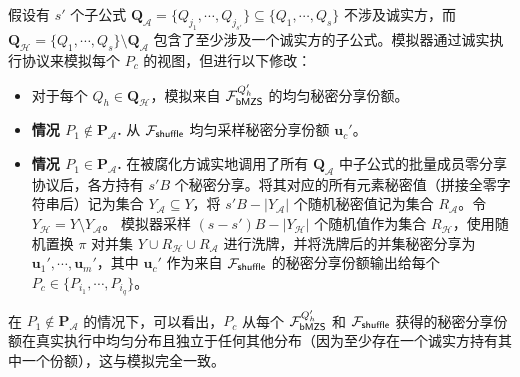 \begin{trivlist}
假设有 $s'$ 个子公式 $\textbf{Q}_{\mathcal{A}} = \{Q_{j_1},\cdots,Q_{j_{s'}}\} \subseteq \{Q_1,\cdots,Q_s\}$ 不涉及诚实方，而 $\textbf{Q}_{\mathcal{H}} = \{Q_1,\cdots,Q_s\} \setminus \textbf{Q}_{\mathcal{A}}$ 包含了至少涉及一个诚实方的子公式。模拟器通过诚实执行协议来模拟每个 $P_c$ 的视图，但进行以下修改：
\begin{itemize}[itemsep=2pt,topsep=0pt,parsep=0pt]
\item 对于每个 $Q_h \in \textbf{Q}_{\mathcal{H}}$，模拟来自 $\mathcal{F}_\mathsf{bMZS}^{Q'_h}$ 的均匀秘密分享份额。
\item \textbf{情况 $P_1 \notin \textbf{P}_{\mathcal{A}}$.} 从 $\mathcal{F}_\mathsf{shuffle}$ 均匀采样秘密分享份额 $\textbf{u}_{c}'$。
\item \textbf{情况 $P_1 \in \textbf{P}_{\mathcal{A}}$.} 在被腐化方诚实地调用了所有 $\textbf{Q}_{\mathcal{A}}$ 中子公式的批量成员零分享协议后，各方持有 $s'B$ 个秘密分享。将其对应的所有元素秘密值（拼接全零字符串后）记为集合 $Y_{\mathcal{A}} \subseteq Y$，将 $s'B - \lvert Y_{\mathcal{A}} \rvert$ 个随机秘密值记为集合 $R_{\mathcal{A}}$。令 $Y_{\mathcal{H}} = Y \setminus Y_{\mathcal{A}}$。
模拟器采样 $(s-s') B - \lvert Y_{\mathcal{H}} \rvert$ 个随机值作为集合 $R_{\mathcal{H}}$，使用随机置换 $\pi$ 对并集 $Y \cup R_{\mathcal{H}} \cup R_{\mathcal{A}}$ 进行洗牌，并将洗牌后的并集秘密分享为 $\textbf{u}_{1}', \cdots,\textbf{u}_{m}'$，其中 $\textbf{u}_{c}'$ 作为来自 $\mathcal{F}_\mathsf{shuffle}$ 的秘密分享份额输出给每个 $P_c \in \{P_{i_1},\cdots,P_{i_q}\}$。
\end{itemize}

在 $P_1 \notin \textbf{P}_{\mathcal{A}}$ 的情况下，可以看出，$P_c$ 从每个 $\mathcal{F}_\mathsf{bMZS}^{Q'_h}$ 和 $\mathcal{F}_\mathsf{shuffle}$ 获得的秘密分享份额在真实执行中均匀分布且独立于任何其他分布（因为至少存在一个诚实方持有其中一个份额），这与模拟完全一致。


\end{trivlist}

